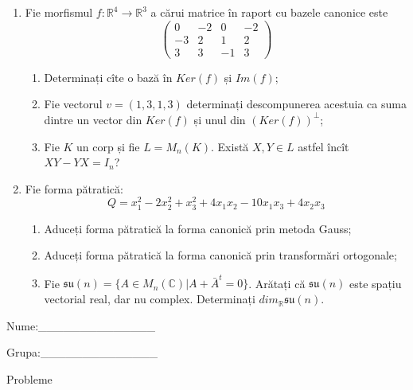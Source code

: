 \documentclass{article}
\begin{document}
\begin{enumerate}
 \item Fie morfismul $f:\mathbb{R}^4 \to \mathbb{R}^3$ a cărui matrice în raport cu bazele canonice este
$$\begin{pmatrix}
0&-2&0&-2\\
-3&2&1&2\\
3&3&-1&3
\end{pmatrix}$$

\begin{enumerate}
\item Determinați cîte o bază în $Ker(f)$ și $Im(f)$;
\item Fie vectorul $v=(1,3,1,3)$ determinați descompunerea acestuia ca suma dintre un vector din $Ker(f)$ și unul din $(Ker(f))^\perp$;
\item Fie $K$ un corp și fie $L=M_n(K)$. Există $X,Y \in L$ astfel încît $XY-YX=I_n$?  
\end{enumerate}
\item Fie forma pătratică:
$$Q= x_1^2-2x_2^2+x_3^2+4x_1x_2-10x_1x_3+4x_2x_3$$

\begin{enumerate}
\item Aduceți forma pătratică la forma canonică prin metoda Gauss;
\item Aduceți forma pătratică la forma canonică prin transformări ortogonale;
\item Fie $\mathfrak{su}(n)=\{ A \in M_n(\mathbb{C}) | A+\bar{A}^t=0\}$. Arătați că $\mathfrak{su}(n)$ este spațiu vectorial real, dar nu complex.
Determinați $dim_{\mathbb{R}}\mathfrak{su}(n)$.
\end{enumerate}
\end{enumerate}
\newpage
\begin{flushright}
Nume:\_\_\_\_\_\_\_\_\_\_\_\_\_\_
 
 
Grupa:\_\_\_\_\_\_\_\_\_\_\_\_\_\_
\end{flushright}
\begin{center}
\vspace{2cm}
{\Large Probleme}
\vspace{2cm}
\end{center}
\end{document}
